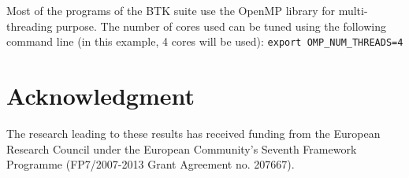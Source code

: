 \documentclass[a4paper,10pt]{article}
\begin{document}
Most of the programs of the BTK suite use the OpenMP library for multi-threading purpose. The number of cores used can be tuned using the following command line (in this example, 4 cores will be used): \texttt{export OMP\_NUM\_THREADS=4}



\section*{Acknowledgment}
\small{The research leading to these results has received funding from the
European Research Council under the European Community’s Seventh Framework
Programme (FP7/2007-2013 Grant Agreement no. 207667).}



\end{document}
